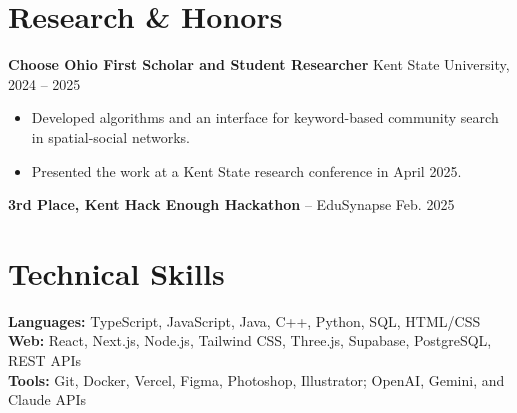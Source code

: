\documentclass[10pt]{article}
\begin{document}
\section*{Research \& Honors}
\textbf{Choose Ohio First Scholar and Student Researcher} \hfill Kent State University, 2024 -- 2025
\begin{itemize}
  \item Developed algorithms and an interface for keyword-based community search in spatial-social networks.
  \item Presented the work at a Kent State research conference in April 2025.
\end{itemize}
\textbf{3rd Place, Kent Hack Enough Hackathon} -- EduSynapse \hfill Feb. 2025

\section*{Technical Skills}
\textbf{Languages:} TypeScript, JavaScript, Java, C++, Python, SQL, HTML/CSS\\
\textbf{Web:} React, Next.js, Node.js, Tailwind CSS, Three.js, Supabase, PostgreSQL, REST APIs\\
\textbf{Tools:} Git, Docker, Vercel, Figma, Photoshop, Illustrator; OpenAI, Gemini, and Claude APIs
\end{document}
